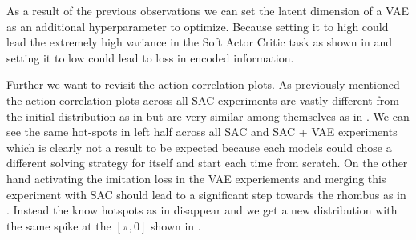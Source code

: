 As a result of the previous observations we can set the latent dimension of a VAE as an additional hyperparameter to optimize. Because setting it to high could lead the extremely high variance in the Soft Actor Critic task as shown in  and setting it to low could lead to loss in encoded information. 

Further we want to revisit the action correlation plots. As previously mentioned the action correlation plots across all SAC experiments are vastly different from the initial distribution as in  but are very similar among themselves as in . We can see the same hot-spots in left half across all SAC and SAC + VAE experiments which is clearly not a result to be expected because each models could chose a different solving strategy for itself and start each time from scratch. On the other hand activating the imitation loss in  the VAE experiements and merging this experiment with SAC should lead to a significant step towards the rhombus as in . Instead the know hotspots as in  disappear and we get a new distribution with the same spike at the $[\pi, 0]$ shown in .
